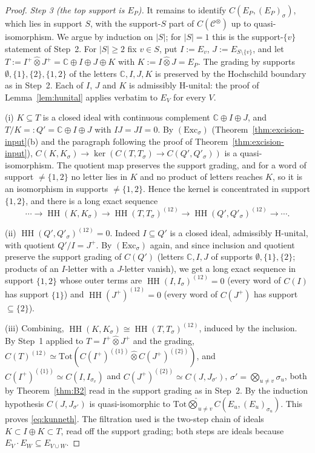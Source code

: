 \documentclass[11pt]{amsart}
\theoremstyle{definition}
\theoremstyle{remark}
\newcommand{\C}{\mathbb C}
\newcommand{\HH}{\operatorname{HH}}
\begin{document}
\begin{proof}
\emph{Step 3 (the top support is $E_P$).}  It remains to identify
$C(E_P,(E_P)_{\sigma})$, which lies in support $S$, with the support-$S$ part
of $C(\mathcal C^{\otimes})$ up to quasi-isomorphism.  We argue by induction
on $|S|$; for $|S|=1$ this is the support-$\{v\}$ statement of Step~2.  For
$|S|\ge2$ fix $v\in S$, put $I:=E_v$, $J:=E_{S\setminus\{v\}}$, and let
$T:=I^{+}\widehat\otimes J^{+}=\C\oplus I\oplus J\oplus K$ with
$K:=I\widehat\otimes J=E_P$.  The grading by supports $\emptyset,\{1\},\{2\},
\{1,2\}$ of the letters $\C,I,J,K$ is preserved by the Hochschild boundary as
in Step~2.  Each of $I$, $J$ and $K$ is admissibly H-unital: the proof of
Lemma~\ref{lem:hunital} applies verbatim to $E_V$ for every $V$.

(i) $K\subseteq T$ is a closed ideal with continuous complement
$\C\oplus I\oplus J$, and $T/K=:Q'=\C\oplus I\oplus J$ with $IJ=JI=0$.  By
$(\mathrm{Exc}_{\sigma})$ (Theorem~\ref{thm:excision-input}(b) and
the paragraph following the proof of Theorem~\ref{thm:excision-input}), $C(K,K_{\sigma})\to\ker(C(T,T_{\sigma})\to
C(Q',Q'_{\sigma}))$ is a quasi-isomorphism.  The quotient map preserves the
support grading, and for a word of support $\ne\{1,2\}$ no letter lies in $K$
and no product of letters reaches $K$, so it is an isomorphism in supports
$\ne\{1,2\}$.  Hence the kernel is concentrated in support $\{1,2\}$, and there
is a long exact sequence
\[
\cdots\to\HH(K,K_{\sigma})\to\HH(T,T_{\sigma})^{(12)}\to
\HH(Q',Q'_{\sigma})^{(12)}\to\cdots .
\]

(ii) $\HH(Q',Q'_{\sigma})^{(12)}=0$.  Indeed $I\subseteq Q'$ is a closed ideal,
admissibly H-unital, with quotient $Q'/I=J^{+}$.  By $(\mathrm{Exc}_{\sigma})$
again, and since inclusion and quotient preserve the support grading of
$C(Q')$ (letters $\C,I,J$ of supports $\emptyset,\{1\},\{2\}$; products of an
$I$-letter with a $J$-letter vanish), we get a long exact sequence in support
$\{1,2\}$ whose outer terms are $\HH(I,I_{\sigma})^{(12)}=0$ (every word of
$C(I)$ has support $\{1\}$) and $\HH(J^{+})^{(12)}=0$ (every word of $C(J^{+})$
has support $\subseteq\{2\}$).

(iii) Combining, $\HH(K,K_{\sigma})\cong\HH(T,T_{\sigma})^{(12)}$, induced by
the inclusion.  By Step~1 applied to $T=I^{+}\widehat\otimes J^{+}$ and the
grading, $C(T)^{(12)}\simeq\mathrm{Tot}(C(I^{+})^{(\{1\})}\widehat\otimes
C(J^{+})^{(\{2\})})$, and $C(I^{+})^{(\{1\})}\simeq C(I,I_{\sigma_v})$ and
$C(J^{+})^{(\{2\})}\simeq C(J,J_{\sigma'})$, $\sigma'=\bigotimes_{u\ne
v}\sigma_u$, both by Theorem~\ref{thm:B2} read in the support grading as in
Step~2.  By the induction hypothesis $C(J,J_{\sigma'})$ is quasi-isomorphic to
$\mathrm{Tot}\widehat\bigotimes_{u\ne v}C(E_u,(E_u)_{\sigma_u})$.  This proves
\eqref{eq:kunneth}.  The filtration used is the two-step chain of ideals
$K\subset I\oplus K\subset T$, read off the support grading; both steps are
ideals because $E_V\cdot E_W\subseteq E_{V\cup W}$.
\end{proof}
\end{document}
